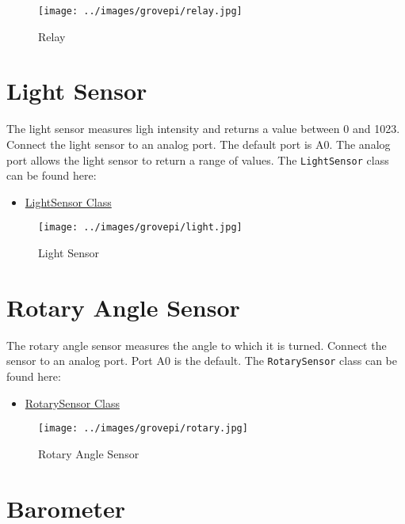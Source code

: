 \begin{figure}
\centering
\texttt{[image: ../images/grovepi/relay.jpg]}
\caption{Relay}
\end{figure}

\section{Light Sensor}\label{light-sensor}

The light sensor measures ligh intensity and returns a value between 0
and 1023. Connect the light sensor to an analog port. The default port
is A0. The analog port allows the light sensor to return a range of
values. The \texttt{LightSensor} class can be found here:

\begin{itemize}

\item
  \href{https://github.com/cloudmesh/cloudmesh.pi/blob/master/cloudmesh/pi/light.py}{LightSensor
  Class}
\end{itemize}

\begin{figure}
\centering
\texttt{[image: ../images/grovepi/light.jpg]}
\caption{Light Sensor}
\end{figure}

\section{Rotary Angle Sensor}\label{rotary-angle-sensor}

The rotary angle sensor measures the angle to which it is turned.
Connect the sensor to an analog port. Port A0 is the default. The
\texttt{RotarySensor} class can be found here:

\begin{itemize}

\item
  \href{https://github.com/cloudmesh/cloudmesh.pi/blob/master/cloudmesh/pi/rotary.py}{RotarySensor
  Class}
\end{itemize}

\begin{figure}
\centering
\texttt{[image: ../images/grovepi/rotary.jpg]}
\caption{Rotary Angle Sensor}
\end{figure}

\section{Barometer}\label{barometer}

